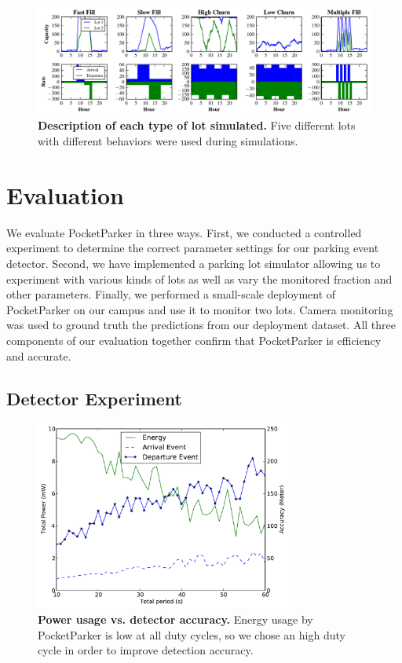 \begin{figure}[t]
\centering
\includegraphics[width=\textwidth]{./simulator/figures/lots.pdf}

\caption{\textbf{Description of each type of lot simulated.} Five different
lots with different behaviors were used during simulations.}

\label{fig-lotsdescription}
\end{figure}

\section{Evaluation}
\label{sec-evaluation}

We evaluate PocketParker in three ways. First, we conducted a controlled
experiment to determine the correct parameter settings for our parking event
detector. Second, we have implemented a parking lot simulator allowing us to
experiment with various kinds of lots as well as vary the monitored fraction
and other parameters. Finally, we performed a small-scale deployment of
PocketParker on our campus and use it to monitor two lots. Camera monitoring
was used to ground truth the predictions from our deployment dataset. All
three components of our evaluation together confirm that PocketParker is
efficiency and accurate.

\subsection{Detector Experiment}

\begin{figure}[t]
\centering
\includegraphics[width=3.325in]{./figures/Energy_accuracy.pdf}

\caption{\textbf{Power usage vs. detector accuracy.} Energy usage by
PocketParker is low at all duty cycles, so we chose an high duty cycle in
order to improve detection accuracy.}

\label{fig-energy}
\end{figure}

